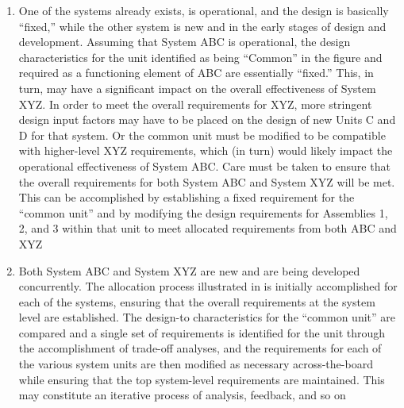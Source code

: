 \begin{enumerate}
	\item One of the systems already exists, is operational, and the design is basically ``fixed,'' while the other system is new and in the early stages of design and development. Assuming that System ABC is operational, the design characteristics for the unit identified as being ``Common'' in the figure and required as a functioning element of ABC are essentially ``fixed.'' This, in turn, may have a significant impact on the overall effectiveness of System XYZ. In order to meet the overall requirements for XYZ, more stringent design input factors may have to be placed on the design of new Units C and D for that system. Or the common unit must be modified to be compatible with higher-level XYZ requirements, which (in turn) would likely impact the operational effectiveness of System ABC. Care must be taken to ensure that the overall requirements for both System ABC and System XYZ will be met. This can be accomplished by establishing a fixed requirement for the ``common unit'' and by modifying the design requirements for Assemblies 1, 2, and 3 within that unit to meet allocated requirements from both ABC and XYZ
	\item Both System ABC and System XYZ are new and are being developed concurrently. The allocation process illustrated in is initially accomplished for each of the systems, ensuring that the overall requirements at the system level are established. The design-to characteristics for the ``common unit'' are compared and a single set of requirements is identified for the unit through the accomplishment of trade-off analyses, and the requirements for each of the various system units are then modified as necessary across-the-board while ensuring that the top system-level requirements are maintained. This may constitute an iterative process of analysis, feedback, and so on
\end{enumerate}

